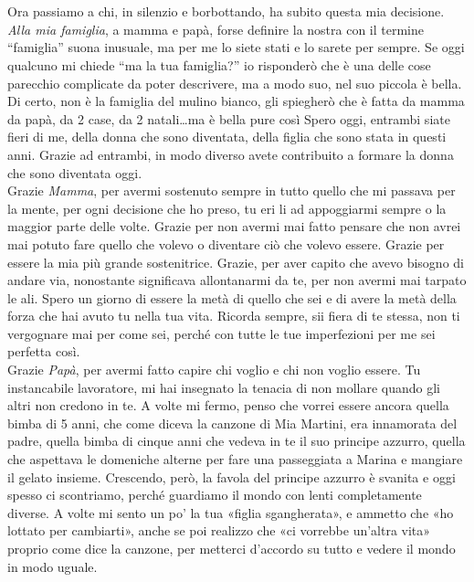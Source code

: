 \\\\
Ora passiamo a chi, in silenzio e borbottando, ha subito questa mia decisione. 
\\
\textit{Alla mia famiglia}, a mamma e papà, forse definire la nostra con il termine “famiglia” suona inusuale, ma per me lo siete stati e lo sarete per sempre. 
Se oggi qualcuno mi chiede “ma la tua famiglia?” io risponderò che è una delle cose parecchio complicate da poter descrivere, ma a modo suo, nel suo piccola è bella. 
Di certo, non è la famiglia del mulino bianco, gli spiegherò che è fatta da mamma da papà, da 2 case, da 2 natali…ma è bella pure così
Spero oggi, entrambi siate fieri di me, della donna che sono diventata, della figlia che sono stata in questi anni. Grazie ad entrambi, in modo diverso avete contribuito a formare la donna che sono diventata oggi.
\\
Grazie \textit{Mamma}, per avermi sostenuto sempre in tutto quello che mi passava per la mente, per ogni decisione che ho preso, tu eri li ad appoggiarmi sempre o la maggior parte delle volte. Grazie per non avermi mai fatto pensare che non avrei mai potuto fare quello che volevo o diventare ciò che volevo essere. Grazie per essere la mia più grande sostenitrice. Grazie, per aver capito che avevo bisogno di andare via, nonostante significava allontanarmi da te, per non avermi mai tarpato le ali.
Spero un giorno di essere la metà di quello che sei e di avere la metà della forza che hai avuto tu nella tua vita. Ricorda sempre, sii fiera di te stessa, non ti vergognare mai per come sei, perché con tutte le tue imperfezioni per me sei perfetta così. 
\\
Grazie \textit{Papà}, per avermi fatto capire chi voglio e chi non voglio essere. Tu instancabile lavoratore, mi hai insegnato la tenacia di non mollare quando gli altri non credono in te.
A volte mi fermo, penso che vorrei essere ancora quella bimba di 5 anni, che come diceva la canzone di Mia Martini, era innamorata del padre, quella bimba di cinque anni che vedeva in te il suo principe azzurro, quella che aspettava le domeniche alterne per fare una passeggiata a Marina e mangiare il gelato insieme. Crescendo, però, la favola del principe azzurro è svanita e oggi spesso ci scontriamo, perché guardiamo il mondo con lenti completamente diverse. A volte mi sento un po' la tua «figlia sgangherata», e ammetto che «ho lottato per cambiarti», anche se poi realizzo che «ci vorrebbe un'altra vita» proprio come dice la canzone, per metterci d'accordo su tutto e vedere il mondo in modo uguale.
